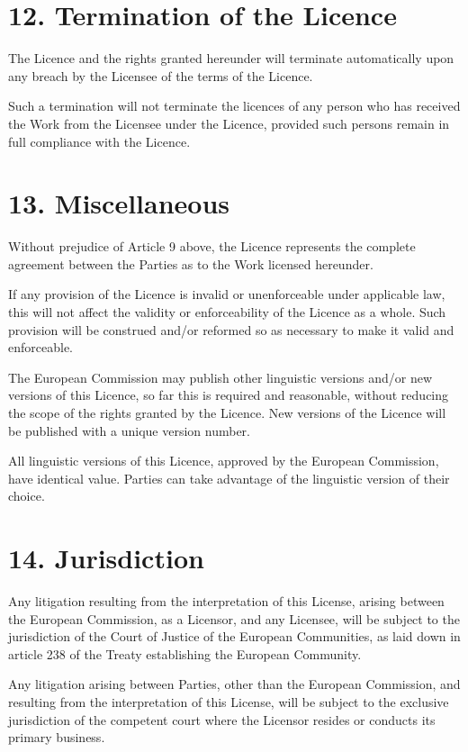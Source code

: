 \documentclass[letterpaper,10pt,english]{sphinxmanual}
\begin{document}
\section{12. Termination of the Licence}
\label{license:termination-of-the-licence}
The Licence and the rights granted hereunder will terminate automatically upon any
breach by the Licensee of the terms of the Licence.

Such a termination will not terminate the licences of any person who has received the
Work from the Licensee under the Licence, provided such persons remain in full
compliance with the Licence.


\section{13. Miscellaneous}
\label{license:miscellaneous}
Without prejudice of Article 9 above, the Licence represents the complete agreement
between the Parties as to the Work licensed hereunder.

If any provision of the Licence is invalid or unenforceable under applicable law, this
will not affect the validity or enforceability of the Licence as a whole. Such provision
will be construed and/or reformed so as necessary to make it valid and enforceable.

The European Commission may publish other linguistic versions and/or new versions
of this Licence, so far this is required and reasonable, without reducing the scope of
the rights granted by the Licence. New versions of the Licence will be published with
a unique version number.

All linguistic versions of this Licence, approved by the European Commission, have
identical value. Parties can take advantage of the linguistic version of their choice.


\section{14. Jurisdiction}
\label{license:jurisdiction}
Any litigation resulting from the interpretation of this License, arising between the
European Commission, as a Licensor, and any Licensee, will be subject to the
jurisdiction of the Court of Justice of the European Communities, as laid down in
article 238 of the Treaty establishing the European Community.

Any litigation arising between Parties, other than the European Commission, and
resulting from the interpretation of this License, will be subject to the exclusive
jurisdiction of the competent court where the Licensor resides or conducts its primary
business.
\end{document}
